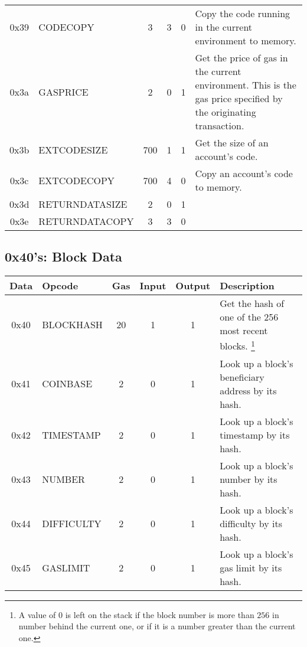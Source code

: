 \documentclass[10pt,letterpaper,leqno,bibliography=totoc]{scrartcl}
\newenvironment{alphafootnotes}
{\par\edef\savedfootnotenumber{\number\value{footnote}}
\renewcommand{\thefootnote}{\alph{footnote}}
\setcounter{footnote}{0}}
{\par\setcounter{footnote}{\savedfootnotenumber}}
\begin{document}
\begin{alphafootnotes}
\begin{longtable}{|cP{2.8cm}cccp{6cm}|}
			0x39 & CODECOPY & 3 & 3 & 0 & Copy the code running in the current environment to memory. \\
			0x3a & GASPRICE & 2 & 0 & 1 & Get the price of gas in the current environment. This is the gas price specified by the originating transaction. \\
			0x3b & EXTCODESIZE & 700 & 1 & 1 & Get the size of an account's code. \\
			0x3c & EXTCODECOPY & 700 & 4 & 0 & Copy an account's code to memory. \\
			0x3d & RETURNDATASIZE & 2 & 0 & 1 & \\
			0x3e & RETURNDATACOPY & 3 & 3 & 0 & \\
			\hline
			\end{longtable}

	        \subsection{0x40's: Block Data}
			\begin{longtable}{|cP{2.8cm}cccp{6cm}|}
			\hline
			\textbf{Data} & \textbf{Opcode} & \textbf{Gas}  & \textbf{Input}  & \textbf{Output} & \textbf{Description} \\
			\hline
			0x40 & BLOCKHASH & 20 & 1 & 1 & Get the hash of one of the 256 most recent blocks. \footnote{A value of 0 is left on the stack if the block number is more than $256$ in number behind the current one, or if it is a number greater than the current one.} \\ 
			0x41 & COINBASE & 2 & 0 & 1 & Look up a block's beneficiary address by its hash.\\
			0x42 & TIMESTAMP & 2 & 0 & 1 & Look up a block's timestamp by its hash.\\
			0x43 & NUMBER & 2  & 0 & 1 & Look up a block's number by its hash. \\
			0x44 & DIFFICULTY & 2 & 0 & 1 & Look up a block's difficulty by its hash. \\
			0x45 & GASLIMIT & 2  & 0 & 1 & Look up a block's gas limit by its hash. \\
			\hline
			\end{longtable}


\end{alphafootnotes}
\end{document}
